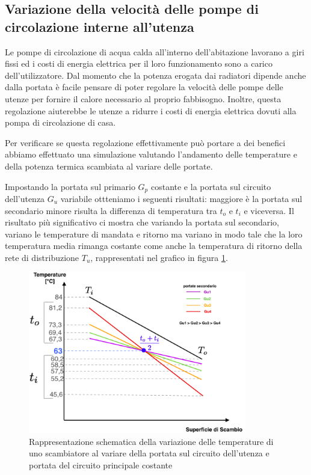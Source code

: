 \documentclass[laurea,oneside,11pt]{USiena_tesiLM}
\begin{document}
\subsection{Variazione della velocità delle pompe di circolazione interne all'utenza}


Le pompe di circolazione di acqua calda all'interno dell'abitazione lavorano a giri fissi ed i costi di energia elettrica per il loro funzionamento sono a carico dell'utilizzatore. Dal momento che la potenza erogata dai radiatori dipende anche dalla portata è facile pensare di poter  regolare la velocità delle pompe delle utenze per fornire il calore necessario al proprio fabbisogno. Inoltre, questa regolazione aiuterebbe le utenze a ridurre i costi di energia elettrica dovuti alla pompa di circolazione di casa.

Per verificare se questa regolazione effettivamente può portare a dei benefici abbiamo effettuato una simulazione valutando  l’andamento delle temperature e della potenza termica scambiata al variare delle portate.

Impostando la portata sul primario $G_p$ costante e la portata sul circuito dell'utenza $G_u$ variabile ottteniamo i seguenti risultati:
maggiore è la portata sul secondario minore risulta la differenza di temperatura tra $t_o$ e $t_i$ e viceversa. Il risultato più significativo ci mostra che variando la portata sul secondario, variano le temperature di mandata e ritorno ma variano in
modo tale che la loro temperatura media rimanga costante come anche la temperatura di ritorno della rete di distribuzione $T_u$, rappresentati nel grafico in figura \ref{fig:pompa_var_utenza}.

\begin{figure}[!ht]
\centering
\includegraphics[width=0.85\textwidth]{figure/pompa_var_utenza} 
\caption{Rappresentazione schematica della variazione delle temperature di uno scambiatore al variare della portata sul circuito dell'utenza e portata del circuito principale costante}
\label{fig:pompa_var_utenza}
\end{figure}
\end{document}
